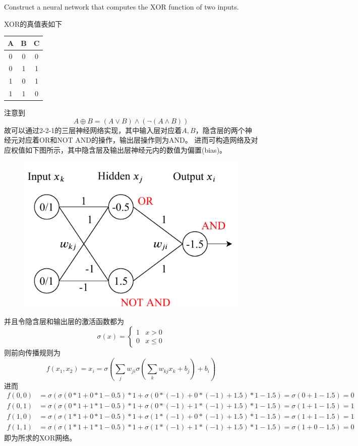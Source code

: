 \documentclass[a4paper, 11pt]{article}
\begin{document}
\begin{question}\normalfont
Construct a neural network that computes the $\mathrm{XOR}$ function of two inputs.
\end{question}
\begin{answer}
XOR的真值表如下
\begin{center}
\begin{tabular}{|c|c|c|}\hline
A & B & C\\\hline
0 & 0 & 0\\\hline
0 & 1 & 1\\\hline
1 & 0 & 1\\\hline
1 & 1 & 0\\\hline
\end{tabular}
\end{center}
注意到
\[A \oplus B= (A \lor B) \land (\lnot (A \land B))\]
故可以通过2-2-1的三层神经网络实现，其中输入层对应着$A,B$，隐含层的两个神经元对应着OR和NOT AND的操作，输出层操作则为AND。
进而可构造网络及对应权值如下图所示，其中隐含层及输出层神经元内的数值为偏置(bias)。
\begin{figure}[H]
\centering
\includegraphics[width=0.5\linewidth]{fig/T04-Q4.pdf}
\end{figure}
并且令隐含层和输出层的激活函数都为
\[\sigma(x)=\begin{cases}
    1 & x > 0\\
    0 & x\leq 0
\end{cases}\]
则前向传播规则为
\[f(x_1,x_2)=x_i=\sigma\left(\sum_j w_{ji}\sigma\left(\sum_k w_{kj}x_k + b_j\right)+b_i\right)\]
进而
\[\begin{aligned}
    f(0,0)&=\sigma(\sigma(0*1+0*1-0.5)*1+\sigma(0*(-1)+0*(-1)+1.5)*1-1.5)=\sigma(0+1-1.5)=0\\
    f(0,1)&=\sigma(\sigma(0*1+1*1-0.5)*1+\sigma(0*(-1)+1*(-1)+1.5)*1-1.5)=\sigma(1+1-1.5)=1\\
    f(1,0)&=\sigma(\sigma(1*1+0*1-0.5)*1+\sigma(1*(-1)+0*(-1)+1.5)*1-1.5)=\sigma(1+1-1.5)=1\\
    f(1,1)&=\sigma(\sigma(1*1+1*1-0.5)*1+\sigma(1*(-1)+1*(-1)+1.5)*1-1.5)=\sigma(1+0-1.5)=0
\end{aligned}\]
即为所求的XOR网络。
\end{answer}
\end{document}

